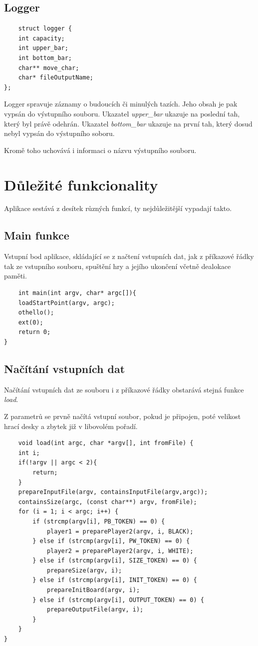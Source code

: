 \documentclass[
12pt,
a4paper,
pdftex,
czech,
titlepage
]{report}
\begin{document}
\subsection{Logger}

\begin{verbatim}
    struct logger {
    int capacity; 
    int upper_bar; 
    int bottom_bar; 
    char** move_char; 
    char* fileOutputName; 
};
\end{verbatim}

Logger spravuje záznamy o budoucích či minulých tazích. Jeho obsah je pak vypsán do výstupního souboru. 
Ukazatel \textit{upper\_bar} ukazuje na poslední tah, který byl právě odehrán. Ukazatel \textit{bottom\_bar} ukazuje na první tah, který dosud nebyl vypsán do výstupního soboru.

Kromě toho uchovává i informaci o názvu výstupního souboru.

\section{Důležité funkcionality}
Aplikace sestává z desítek různých funkcí, ty nejdůležitější vypadají takto.  
\subsection{Main funkce}
Vstupní bod aplikace, skládající se z načtení vstupních dat, jak z příkazové řádky tak ze vstupního souboru, spuštění hry a jejího ukončení včetně dealokace paměti.

\begin{verbatim}
    int main(int argv, char* argc[]){
    loadStartPoint(argv, argc);
    othello();
    ext(0);
    return 0;
}

\end{verbatim}

\subsection{Načítání vstupních dat}
Načítání vstupních dat ze souboru i z příkazové řádky obstarává stejná funkce \textit{load}. 

Z parametrů se prvně načítá vstupní soubor, pokud je připojen, poté velikost hrací desky a zbytek již v libovolém pořadí.
\begin{verbatim}
    void load(int argc, char *argv[], int fromFile) {
    int i;
    if(!argv || argc < 2){
        return;
    }
    prepareInputFile(argv, containsInputFile(argv,argc));
    containsSize(argc, (const char**) argv, fromFile);
    for (i = 1; i < argc; i++) {
        if (strcmp(argv[i], PB_TOKEN) == 0) {
            player1 = preparePlayer2(argv, i, BLACK);
        } else if (strcmp(argv[i], PW_TOKEN) == 0) {
            player2 = preparePlayer2(argv, i, WHITE);
        } else if (strcmp(argv[i], SIZE_TOKEN) == 0) {
            prepareSize(argv, i);
        } else if (strcmp(argv[i], INIT_TOKEN) == 0) {
            prepareInitBoard(argv, i);
        } else if (strcmp(argv[i], OUTPUT_TOKEN) == 0) {
            prepareOutputFile(argv, i);
        }
    }
}
\end{verbatim}
\end{document}
